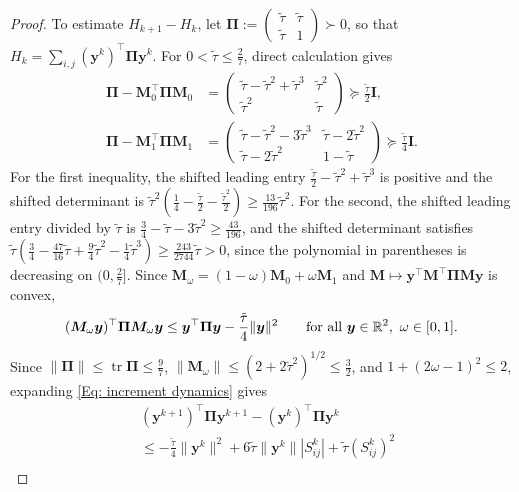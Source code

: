 \begin{proof}
    To estimate $H_{k+1}-H_k$, let $\bm{\Pi}:=\begin{pmatrix}\tilde\tau&\tilde\tau\\ \tilde\tau&1\end{pmatrix}\succ0$, so that $H_k=\sum_{i,j}(\bm{y}^k)^\top\bm{\Pi}\bm{y}^k$. For $0<\tilde\tau\le\frac27$, direct calculation gives
    \begin{align*}
        \bm{\Pi}-\bm{M}_0^\top\bm{\Pi}\bm{M}_0
        &=\begin{pmatrix}\tilde\tau-\tilde\tau^2+\tilde\tau^3&\tilde\tau^2\\ \tilde\tau^2&\tilde\tau\end{pmatrix}\succeq\frac{\tilde\tau}{2}\bm{I},\\
        \bm{\Pi}-\bm{M}_1^\top\bm{\Pi}\bm{M}_1
        &=\begin{pmatrix}\tilde\tau-\tilde\tau^2-3\tilde\tau^3&\tilde\tau-2\tilde\tau^2\\ \tilde\tau-2\tilde\tau^2&1-\tilde\tau\end{pmatrix}\succeq\frac{\tilde\tau}{4}\bm{I}.
    \end{align*}
    For the first inequality, the shifted leading entry $\frac{\tilde\tau}{2}-\tilde\tau^2+\tilde\tau^3$ is positive and the shifted determinant is $\tilde\tau^2(\frac14-\frac{\tilde\tau}{2}-\frac{\tilde\tau^2}2)\ge\frac{13}{196}\tilde\tau^2$. For the second, the shifted leading entry divided by $\tilde\tau$ is $\frac34-\tilde\tau-3\tilde\tau^2\ge\frac{43}{196}$, and the shifted determinant satisfies $\tilde\tau (\frac34-\frac{47}{16}\tilde\tau+\frac94\tilde\tau^2-\frac14\tilde\tau^3)\ge\frac{243}{2744}\tilde\tau>0$, since the polynomial in parentheses is decreasing on $(0,\frac27]$. Since $\bm{M}_\omega=(1-\omega)\bm{M}_0+\omega\bm{M}_1$ and $\bm{M}\mapsto\bm{y}^\top\bm{M}^\top\bm{\Pi}\bm{M}\bm{y}$ is convex,
    \begin{equation*}
        (\bm{M}_\omega\bm{y})^\top\bm{\Pi}\bm{M}_\omega\bm{y}\le\bm{y}^\top\bm{\Pi}\bm{y}-\frac{\tilde\tau}{4}\|\bm{y}\|^2\qquad\text{for all }\bm{y}\in\mathbb{R}^2,\ \omega\in[0,1].
    \end{equation*}
    Since $\|\bm{\Pi}\|\le\operatorname{tr}\bm{\Pi}\le\frac97$, $\|\bm{M}_\omega\|\le(2+2\tilde\tau^2)^{1/2}\le\frac32$, and $1+(2\omega-1)^2\le2$, expanding \eqref{Eq: increment dynamics} gives
    \begin{align*}
        &(\bm{y}^{k+1})^\top\bm{\Pi}\bm{y}^{k+1}-(\bm{y}^k)^\top\bm{\Pi}\bm{y}^k\\
        &\le-\frac{\tilde\tau}{4}\|\bm{y}^k\|^2+6\tilde\tau\|\bm{y}^k\||S_{ij}^k|+\tilde\tau (S_{ij}^k)^2\\

\end{align*}
\end{proof}
